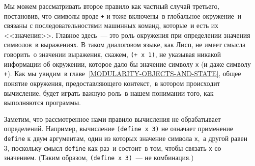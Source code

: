Мы можем рассматривать второе правило как частный случай третьего,
постановив, что символы вроде {\tt +} и
{\tt *} тоже включены~в глобальное окружение~и связаны
с последовательностями машинных команд, которые~и есть их
<<значения>>.  Главное здесь~--- это роль окружения
при определении значения символов~в выражениях. В таком диалоговом
языке, как Лисп, не имеет смысла говорить~о значении выражения, скажем,
{\tt (+ x 1)}, не указывая никакой информации об
окружении, которое дало бы значение символу {\tt x} (и
даже символу {\tt +}).  Как мы увидим~в 
главе~\ref{MODULARITY-OBJECTS-AND-STATE}, общее 
понятие окружения, предоставляющего контекст,~в котором
происходит вычисление, будет играть важную роль~в нашем понимании
того, как выполняются программы.

Заметим, что рассмотренное нами правило вычисления не
обрабатывает определений.  Например, вычисление {\tt (define x
3)} не означает применение {\tt define} к
двум аргументам, один из которых значение символа
{\tt x},~а другой равен 3, поскольку смысл
{\tt define} как раз~и состоит~в том, чтобы связать
{\tt x} со значением.  (Таким образом,
{\tt (define x~3)}~--- не комбинация.)

